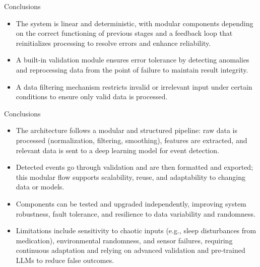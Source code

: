 \documentclass[10pt]{beamer} %
\begin{document}
\begin{frame}{Conclusions}
\begin{itemize}
  \item The system is linear and deterministic, with modular components depending on the correct functioning of previous stages and a feedback loop that reinitializes processing to resolve errors and enhance reliability.

  \item  A built-in validation module ensures error tolerance by detecting anomalies and reprocessing data from the point of failure to maintain result integrity.

  \item A data filtering mechanism restricts invalid or irrelevant input under certain conditions to ensure only valid data is processed.

\end{itemize}
\end{frame}
\begin{frame}{Conclusions}
\begin{itemize}
      \item  The architecture follows a modular and structured pipeline: raw data is processed (normalization, filtering, smoothing), features are extracted, and relevant data is sent to a deep learning model for event detection.

      \item  Detected events go through validation and are then formatted and exported; this modular flow supports scalability, reuse, and adaptability to changing data or models.

     \item  Components can be tested and upgraded independently, improving system robustness, fault tolerance, and resilience to data variability and randomness.

     \item  Limitations include sensitivity to chaotic inputs (e.g., sleep disturbances from medication), environmental randomness, and sensor failures, requiring continuous adaptation and relying on advanced validation and pre-trained LLMs to reduce false outcomes.
\end{itemize}

\end{frame}

\end{document}
